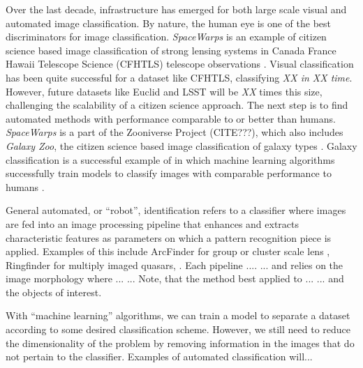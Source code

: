 \documentclass{emulateapj}
\newcommand{\change}[1]{{\it\color{purple} #1}}
\begin{document}
Over the last decade, infrastructure has emerged for both large scale
visual and automated image classification. By nature, the human eye is
one of the best discriminators for image classification.  {\em
  SpaceWarps} is an example of citizen science based image
classification of strong lensing systems in Canada France Hawaii
Telescope Science (CFHTLS) telescope observations
\citep{marshall_etal16,more_etal16}.  Visual classification has been
quite successful for a dataset like CFHTLS, classifying \change{XX in
  XX time}.  However, future datasets like Euclid and LSST will be
\change{XX} times this size, challenging the scalability of a citizen
science approach.  The next step is to find automated methods with
performance comparable to or better than humans. {\em SpaceWarps} is a
part of the Zooniverse Project (CITE???), which also includes {\em
  Galaxy Zoo}, the citizen science based image classification of
galaxy types \citep{lintott_etal08}.  Galaxy classification is a
successful example of in which machine learning algorithms
successfully train models to classify images with comparable
performance to humans \citep{dieleman_etal15}.

General automated, or ``robot'', identification refers to a classifier
where images are fed into an image processing pipeline that enhances
and extracts characteristic features as parameters on which a pattern
recognition piece is applied.  Examples of this include ArcFinder for
group or cluster scale lens \citep{seidelandbartelmann_07}, Ringfinder
for multiply imaged quasars\citep{gavazzi_etal14}, .  Each pipeline
.... ... and relies on the image morphology where ... ...  Note, that
the method best applied to ... ... and the objects of interest.

With ``machine learning'' algorithms, we can train a model to separate
a dataset according to some desired classification scheme.  However,
we still need to reduce the dimensionality of the problem by removing
information in the images that do not pertain to the classifier.
Examples of automated classification will...
\end{document}
